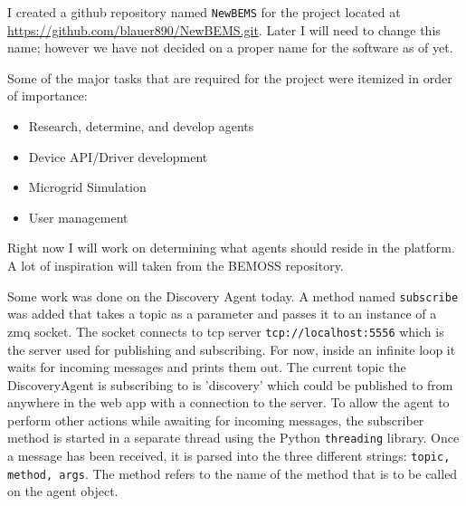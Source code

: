 \documentclass[fontsize=11pt, %
                             paper=letter, %
                             twoside, %
                             captions=tableheading,
                             index=totoc,
                             hyperref]{labbook}
\begin{document}
\begin{addmargin}[0cm]{0cm}
I created a github repository named \texttt{NewBEMS} for the project located at \url{https://github.com/blauer890/NewBEMS.git}. Later I will need to change this name; however we have not decided on a proper name for the software as of yet.

Some of the major tasks that are required for the project were itemized in order of importance:
\begin{itemize}
\item Research, determine, and develop agents
\item Device API/Driver development
\item Microgrid Simulation
\item User management
\end{itemize}
Right now I will work on determining what agents should reside in the platform. A lot of inspiration will taken from the BEMOSS repository. 

Some work was done on the Discovery Agent today. A method named \texttt{subscribe} was added that takes a topic as a parameter and passes it to an instance of a zmq socket. The socket connects to tcp server \texttt{tcp://localhost:5556} which is the server used for publishing and subscribing. For now, inside an infinite loop it waits for incoming messages and prints them out. The current topic the DiscoveryAgent is subscribing to is 'discovery' which could be published to from anywhere in the web app with a connection to the server. To allow the agent to perform other actions while awaiting for incoming messages, the subscriber method is started in a separate thread using the Python \texttt{threading} library. 
\smallbreak\noindent
Once a message has been received, it is parsed into the three different strings:
\texttt{topic, method, args}. The method refers to the name of the method that is to be called on the agent object.


\end{addmargin}
\end{document}

